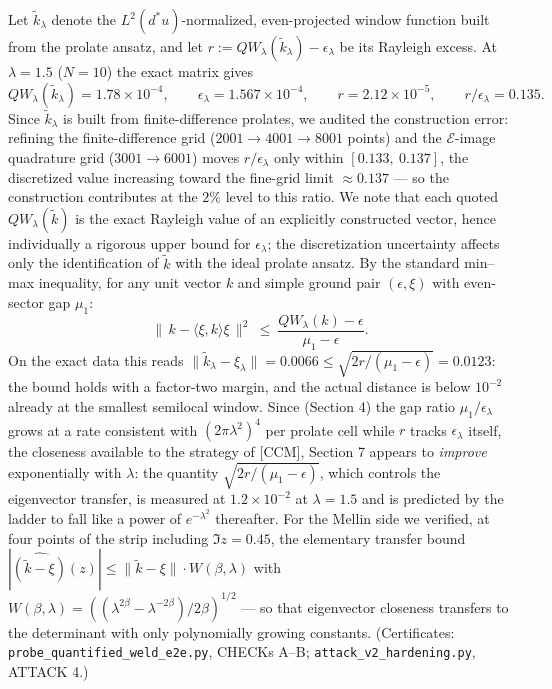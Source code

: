 \documentclass[
  letterpaper,
  11pt]{article}
\theoremstyle{plain}
\theoremstyle{definition}
\theoremstyle{remark}
\begin{document}
Let \(\tilde k_\lambda\) denote the \(L^2(d^*u)\)-normalized, even-projected window function built from the prolate ansatz, and let \(r := QW_\lambda(\tilde k_\lambda) - \epsilon_\lambda\) be its Rayleigh excess. At \(\lambda = 1.5\) (\(N = 10\)) the exact matrix gives
\[
QW_\lambda(\tilde k_\lambda) = 1.78\times10^{-4}, \qquad \epsilon_\lambda = 1.567\times10^{-4}, \qquad r = 2.12\times10^{-5}, \qquad r/\epsilon_\lambda = 0.135 .
\]
Since \(\tilde k_\lambda\) is built from finite-difference prolates, we audited the construction error: refining the finite-difference grid (\(2001 \to 4001 \to 8001\) points) and the \(\mathcal E\)-image quadrature grid (\(3001 \to 6001\)) moves \(r/\epsilon_\lambda\) only within \([0.133,\ 0.137]\), the discretized value increasing toward the fine-grid limit \(\approx 0.137\) --- so the construction contributes at the \(2\%\) level to this ratio. We note that each quoted \(QW_\lambda(\tilde k)\) is the exact Rayleigh value of an explicitly constructed vector, hence individually a rigorous upper bound for \(\epsilon_\lambda\); the discretization uncertainty affects only the identification of \(\tilde k\) with the ideal prolate ansatz. By the standard min--max inequality, for any unit vector \(k\) and simple ground pair \((\epsilon, \xi)\) with even-sector gap \(\mu_1\):
\[
\big\|\,k - \langle\xi, k\rangle\xi\,\big\|^2 \ \le\ \frac{QW_\lambda(k) - \epsilon}{\mu_1 - \epsilon}.
\]
On the exact data this reads \(\|\tilde k_\lambda - \xi_\lambda\| = 0.0066 \le \sqrt{2r/(\mu_1-\epsilon)} = 0.0123\): the bound holds with a factor-two margin, and the actual distance is below \(10^{-2}\) already at the smallest semilocal window. Since (Section 4) the gap ratio \(\mu_1/\epsilon_\lambda\) grows at a rate consistent with \((2\pi\lambda^2)^4\) per prolate cell while \(r\) tracks \(\epsilon_\lambda\) itself, the closeness available to the strategy of {[}CCM{]}, Section 7 appears to \emph{improve} exponentially with \(\lambda\): the quantity \(\sqrt{2r/(\mu_1-\epsilon)}\), which controls the eigenvector transfer, is measured at \(1.2\times10^{-2}\) at \(\lambda=1.5\) and is predicted by the ladder to fall like a power of \(e^{-\lambda^2}\) thereafter. For the Mellin side we verified, at four points of the strip including \(\Im z = 0.45\), the elementary transfer bound \(|\widehat{(\tilde k-\xi)}(z)| \le \|\tilde k - \xi\|\cdot W(\beta,\lambda)\) with \(W(\beta,\lambda) = ((\lambda^{2\beta} - \lambda^{-2\beta})/2\beta)^{1/2}\) --- so that eigenvector closeness transfers to the determinant with only polynomially growing constants. (Certificates: \texttt{probe\_quantified\_weld\_e2e.py}, CHECKs A--B; \texttt{attack\_v2\_hardening.py}, ATTACK 4.)
\end{document}
